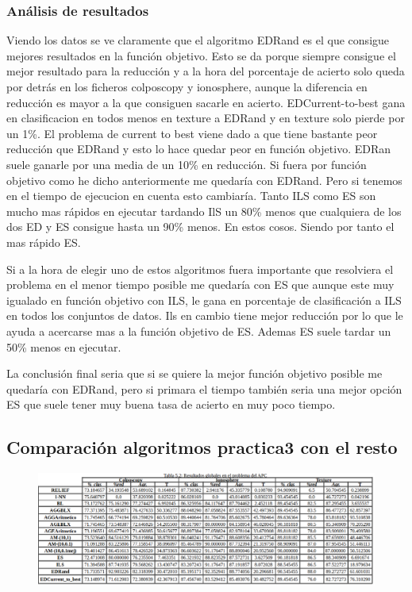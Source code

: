 \documentclass[titlepage]{article}
\begin{document}
	\subsubsection{Análisis de resultados}
	Viendo los datos se ve claramente que el algoritmo EDRand es el que consigue mejores resultados en la función objetivo. Esto se da porque siempre consigue el mejor resultado para la reducción y a la hora del porcentaje de acierto solo queda por detrás en los ficheros colposcopy y ionosphere, aunque la diferencia en reducción es mayor a la que consiguen sacarle en acierto. EDCurrent-to-best gana en clasificacion en todos menos en texture a EDRand y en texture solo pierde por un 1\%. El problema de current to best viene dado a que tiene bastante peor reducción que EDRand y esto lo hace quedar peor en función objetivo. EDRan suele ganarle por una media de un 10\% en reducción.
	Si fuera por función objetivo como he dicho anteriormente me quedaría con EDRand. Pero si tenemos en el tiempo de ejecucion en cuenta esto cambiaría. Tanto ILS como ES son mucho mas rápidos en ejecutar tardando IlS un 80\% menos que cualquiera de los dos ED y ES consigue hasta un 90\% menos. En estos cosos. Siendo por tanto el mas rápido ES. 
	
	Si a la hora de elegir uno de estos algoritmos fuera importante que resolviera el problema en el menor tiempo posible me quedaría con ES que aunque este muy igualado en función objetivo con ILS, le gana en porcentaje de clasificación a ILS en todos los conjuntos de datos. Ils en cambio tiene mejor reducción por lo que le ayuda a acercarse mas a la función objetivo de ES. Ademas ES suele tardar un 50\% menos en ejecutar. 
	
	La conclusión final seria que si se quiere la mejor función objetivo posible me quedaría con EDRand, pero si primara el tiempo también seria una mejor opción ES que suele tener muy buena tasa de acierto en muy poco tiempo.
	
	\subsection{Comparación algoritmos practica3 con el resto}
	\begin{figure}[H]
		\centering
		\includegraphics[width=1\linewidth]{screenshot015}
		\caption{}
		\label{fig:screenshot015}
	\end{figure}
	
\end{document}
